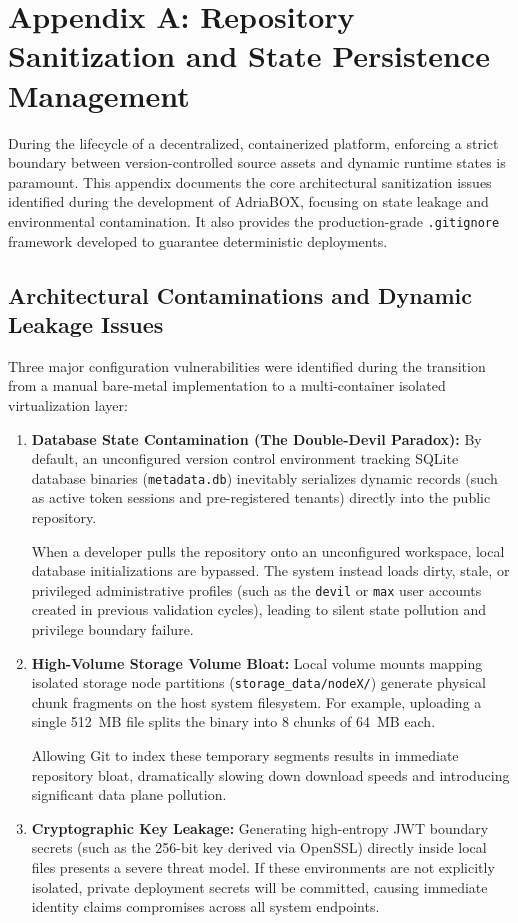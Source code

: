 \section{Appendix A: Repository Sanitization and State Persistence Management}
\label{sec:appendix_a}

During the lifecycle of a decentralized, containerized platform, enforcing a strict boundary between version-controlled source assets and dynamic runtime states is paramount. This appendix documents the core architectural sanitization issues identified during the development of AdriaBOX, focusing on state leakage and environmental contamination. It also provides the production-grade \texttt{.gitignore} framework developed to guarantee deterministic deployments.

\subsection{Architectural Contaminations and Dynamic Leakage Issues}
Three major configuration vulnerabilities were identified during the transition from a manual bare-metal implementation to a multi-container isolated virtualization layer:

\begin{enumerate}
    \item \textbf{Database State Contamination (The Double-Devil Paradox):} 
    By default, an unconfigured version control environment tracking SQLite database binaries (\texttt{metadata.db}) inevitably serializes dynamic records (such as active token sessions and pre-registered tenants) directly into the public repository. 
    
    When a developer pulls the repository onto an unconfigured workspace, local database initializations are bypassed. The system instead loads dirty, stale, or privileged administrative profiles (such as the \texttt{devil} or \texttt{max} user accounts created in previous validation cycles), leading to silent state pollution and privilege boundary failure.
    
    \item \textbf{High-Volume Storage Volume Bloat:} 
    Local volume mounts mapping isolated storage node partitions (\texttt{storage\_data/nodeX/}) generate physical chunk fragments on the host system filesystem. For example, uploading a single 512~MB file splits the binary into 8 chunks of 64~MB each. 
    
    Allowing Git to index these temporary segments results in immediate repository bloat, dramatically slowing down download speeds and introducing significant data plane pollution.
    
    \item \textbf{Cryptographic Key Leakage:} 
    Generating high-entropy JWT boundary secrets (such as the 256-bit key derived via OpenSSL) directly inside local files presents a severe threat model. If these environments are not explicitly isolated, private deployment secrets will be committed, causing immediate identity claims compromises across all system endpoints.
\end{enumerate}

